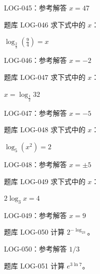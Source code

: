 \documentclass[aspectratio=169,10pt]{beamer}
\begin{document}
\ifdefined\TeacherEdition
\begin{frame}[t]{LOG-045：参考解答}
$x=47$
\end{frame}
\fi

\begin{campuspractice}{题库 LOG-046}
求下式中的 $x$：\par
$\log_{\frac{2}{3}}(\frac{9}{4})=x$
\end{campuspractice}

\ifdefined\TeacherEdition
\begin{frame}[t]{LOG-046：参考解答}
$x=-2$
\end{frame}
\fi

\begin{campuspractice}{题库 LOG-047}
求下式中的 $x$：\par
$x=\log_{\frac{1}{2}}32$
\end{campuspractice}

\ifdefined\TeacherEdition
\begin{frame}[t]{LOG-047：参考解答}
$x=-5$
\end{frame}
\fi

\begin{campuspractice}{题库 LOG-048}
求下式中的 $x$：\par
$\log_5(x^2)=2$
\end{campuspractice}

\ifdefined\TeacherEdition
\begin{frame}[t]{LOG-048：参考解答}
$x=\pm5$
\end{frame}
\fi

\begin{campuspractice}{题库 LOG-049}
求下式中的 $x$：\par
$2\log_3x=4$
\end{campuspractice}

\ifdefined\TeacherEdition
\begin{frame}[t]{LOG-049：参考解答}
$x=9$
\end{frame}
\fi

\begin{campuspractice}{题库 LOG-050}
计算 $2^{-\log_23}$。
\end{campuspractice}

\ifdefined\TeacherEdition
\begin{frame}[t]{LOG-050：参考解答}
$1/3$
\end{frame}
\fi

\begin{campuspractice}{题库 LOG-051}
计算 $e^{3\ln7}$。
\end{campuspractice}
\end{document}
